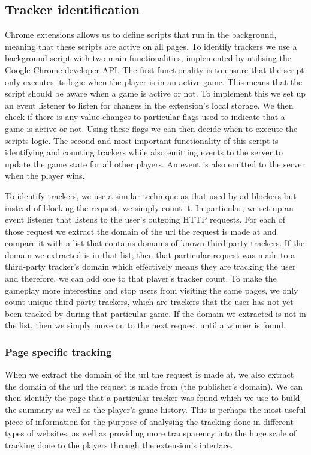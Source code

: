 \documentclass{l4proj}
\begin{document}
\subsection{Tracker identification}
Chrome extensions allows us to define scripts that run in the background, meaning that these scripts are active on all pages. To identify trackers we use a background script with two main functionalities, implemented by utilising the Google Chrome developer API. The first functionality is to ensure that the script only executes its logic when the player is in an active game. This means that the script should be aware when a game is active or not. To implement this we set up an event listener to listen for changes in the extension's local storage. We then check if there is any value changes to particular flags used to indicate that a game is active or not. Using these flags we can then decide when to execute the scripts logic. The second and most important functionality of this script is identifying and counting trackers while also emitting events to the server to update the game state for all other players. An event is also emitted to the server when the player wins. 

To identify trackers, we use a similar technique as that used by ad blockers but instead of blocking the request, we simply count it. In particular, we set up an event listener that listens to the user's outgoing HTTP requests. For each of those request we extract the domain of the url the request is made at and compare it with a list that contains domains of known third-party trackers. If the domain we extracted is in that list, then that particular request was made to a third-party tracker's domain which effectively means they are tracking the user and therefore, we can add one to that player's tracker count. To make the gameplay more interesting and stop users from visiting the same pages, we only count unique third-party trackers, which are trackers that the user has not yet been tracked by during that particular game. If the domain we extracted is not in the list, then we simply move on to the next request until a winner is found.

\subsubsection{Page specific tracking}
When we extract the domain of the url the request is made at, we also extract the domain of the url the request is made from (the publisher's domain). We can then identify the page that a particular tracker was found which we use to build the summary as well as the player's game history. This is perhaps the most useful piece of information for the purpose of analysing the tracking done in different types of websites, as well as providing more transparency into the huge scale of tracking done to the players through the extension's interface.
\end{document}
